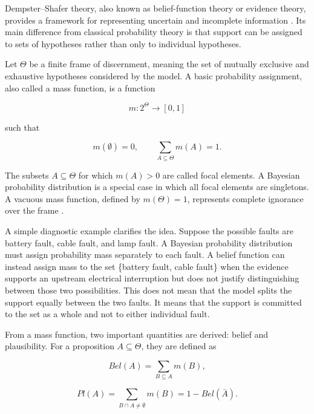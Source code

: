 \documentclass[runningheads]{llncs}
\begin{document}
Dempster--Shafer theory, also known as belief-function theory or evidence theory, provides a framework for representing uncertain and incomplete information \cite{Dempster1967,Shafer1976}. Its main difference from classical probability theory is that support can be assigned to sets of hypotheses rather than only to individual hypotheses.

Let $\Theta$ be a finite frame of discernment, meaning the set of mutually exclusive and exhaustive hypotheses considered by the model. A basic probability assignment, also called a mass function, is a function

\begin{equation}
m : 2^{\Theta} \rightarrow [0,1]
\label{eq:mass_function}
\end{equation}

such that

\begin{equation}
m(\emptyset) = 0, \qquad \sum_{A \subseteq \Theta} m(A) = 1.
\label{eq:mass_constraints}
\end{equation}

The subsets $A \subseteq \Theta$ for which $m(A)>0$ are called focal elements. A Bayesian probability distribution is a special case in which all focal elements are singletons. A vacuous mass function, defined by $m(\Theta)=1$, represents complete ignorance over the frame \cite{Shafer1976,SmetsKennes1994}.

A simple diagnostic example clarifies the idea. Suppose the possible faults are battery fault, cable fault, and lamp fault. A Bayesian probability distribution must assign probability mass separately to each fault. A belief function can instead assign mass to the set \{battery fault, cable fault\} when the evidence supports an upstream electrical interruption but does not justify distinguishing between those two possibilities. This does not mean that the model splits the support equally between the two faults. It means that the support is committed to the set as a whole and not to either individual fault.

From a mass function, two important quantities are derived: belief and plausibility. For a proposition $A \subseteq \Theta$, they are defined as

\begin{equation}
Bel(A) = \sum_{B \subseteq A} m(B),
\label{eq:belief}
\end{equation}

\begin{equation}
Pl(A) = \sum_{B \cap A \neq \emptyset} m(B) = 1 - Bel(\bar{A}).
\label{eq:plausibility}
\end{equation}
\end{document}
